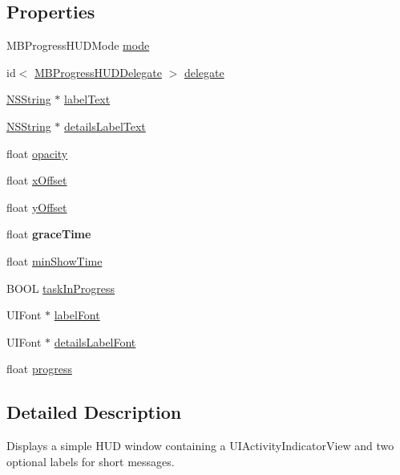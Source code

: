 \subsection*{Properties}
\begin{DoxyCompactItemize}
\item 
MBProgressHUDMode \hyperlink{interface_m_b_progress_h_u_d_ace77eaaf507e86fe56436f7ee7b6fdc9}{mode}
\item 
id$<$ \hyperlink{protocol_m_b_progress_h_u_d_delegate-p}{MBProgressHUDDelegate} $>$ \hyperlink{interface_m_b_progress_h_u_d_a81a508c2375e4e97d5450bc3898ff7d9}{delegate}
\item 
\hyperlink{class_n_s_string}{NSString} $\ast$ \hyperlink{interface_m_b_progress_h_u_d_ae43d72850b8dd657db1b383be0566093}{labelText}
\item 
\hyperlink{class_n_s_string}{NSString} $\ast$ \hyperlink{interface_m_b_progress_h_u_d_ab5ad528a731e513b39e3183129af1f37}{detailsLabelText}
\item 
float \hyperlink{interface_m_b_progress_h_u_d_a24ab5e37917e3489d6add081324a49ff}{opacity}
\item 
float \hyperlink{interface_m_b_progress_h_u_d_a4e6ee114c04b90ced1a253a6d33ba785}{xOffset}
\item 
float \hyperlink{interface_m_b_progress_h_u_d_ad526ffcabab5131697eb0850c50ab1f4}{yOffset}
\item 
\hypertarget{interface_m_b_progress_h_u_d_a6f837c351a405d0bb6ec05856d7776dd}{
float {\bfseries graceTime}}
\label{interface_m_b_progress_h_u_d_a6f837c351a405d0bb6ec05856d7776dd}

\item 
float \hyperlink{interface_m_b_progress_h_u_d_a9946e4b0b16d75f070ff0cbcc50226ef}{minShowTime}
\item 
BOOL \hyperlink{interface_m_b_progress_h_u_d_a6077ea42c37c18b3058ed63ac10ede8f}{taskInProgress}
\item 
UIFont $\ast$ \hyperlink{interface_m_b_progress_h_u_d_a85b03f18b8313f4c3efc2002ad79ff27}{labelFont}
\item 
UIFont $\ast$ \hyperlink{interface_m_b_progress_h_u_d_af3a772e02286bf867c2b4c2213be0180}{detailsLabelFont}
\item 
float \hyperlink{interface_m_b_progress_h_u_d_a4c8328617d11efd1f5452032246ca97f}{progress}
\end{DoxyCompactItemize}


\subsection{Detailed Description}
Displays a simple HUD window containing a UIActivityIndicatorView and two optional labels for short messages.

